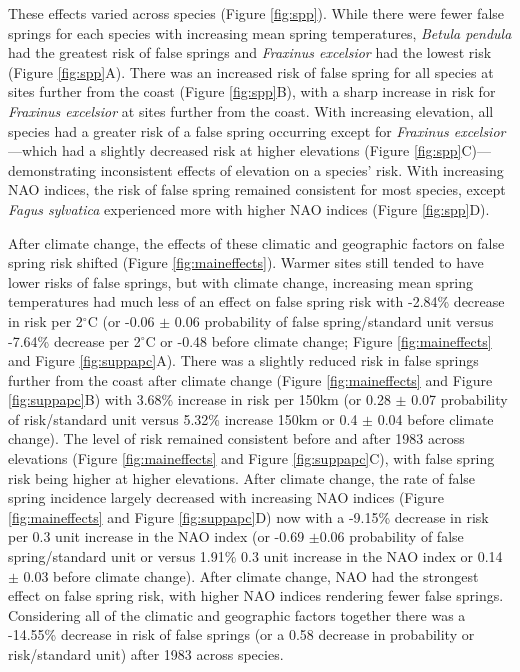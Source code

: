 \documentclass{article}\usepackage[]{graphicx}\usepackage[]{color}
\begin{document}
These effects varied across species (Figure \ref{fig:spp}). While there were fewer false springs for each species with increasing mean spring temperatures,  \textit{Betula pendula} had the greatest risk of false springs and \textit{Fraxinus excelsior} had the lowest risk (Figure \ref{fig:spp}A). There was an increased risk of false spring for all species at sites further from the coast (Figure \ref{fig:spp}B), with a sharp increase in risk for \textit{Fraxinus excelsior} at sites further from the coast. With increasing elevation, all species had a greater risk of a false spring occurring except for \textit{Fraxinus excelsior}---which had a slightly decreased risk at higher elevations (Figure \ref{fig:spp}C)---demonstrating inconsistent effects of elevation on a species' risk.  With increasing NAO indices, the risk of false spring remained consistent for most species, except \textit{Fagus sylvatica} experienced more with higher NAO indices (Figure \ref{fig:spp}D). 

After climate change, the effects of these climatic and geographic factors on false spring risk shifted (Figure \ref{fig:maineffects}). Warmer sites still tended to have lower risks of false springs, but with climate change, increasing mean spring temperatures had much less of an effect on false spring risk with -2.84\% decrease in risk per 2$^{\circ}$C (or -0.06 $\pm$ 0.06 probability of false spring/standard unit versus -7.64\% decrease per 2$^{\circ}$C or -0.48 before climate change; Figure \ref{fig:maineffects} and Figure \ref{fig:suppapc}A). There was a slightly reduced risk in false springs further from the coast after climate change (Figure \ref{fig:maineffects} and Figure \ref{fig:suppapc}B) with 3.68\% increase in risk per 150km (or 0.28 $\pm$ 0.07 probability of risk/standard unit versus 5.32\% increase 150km or 0.4 $\pm$ 0.04 before climate change). The level of risk remained consistent before and after 1983 across elevations (Figure \ref{fig:maineffects} and Figure \ref{fig:suppapc}C), with false spring risk being higher at higher elevations. After climate change, the rate of false spring incidence largely decreased with increasing NAO indices (Figure \ref{fig:maineffects} and Figure \ref{fig:suppapc}D) now with a -9.15\% decrease in risk per 0.3 unit increase in the NAO index (or -0.69 $\pm$0.06 probability of false spring/standard unit or versus 1.91\% 0.3 unit increase in the NAO index or 0.14 $\pm$ 0.03 before climate change). After climate change, NAO had the strongest effect on false spring risk, with higher NAO indices rendering fewer false springs. Considering all of the climatic and geographic factors together there was a -14.55\% decrease in risk of false springs (or a 0.58 decrease in probability or risk/standard unit) after 1983 across species.
\end{document}

